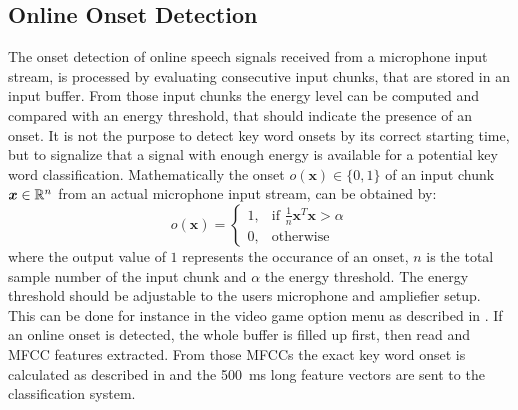 
\subsection{Online Onset Detection}\label{sec:signal_onset_online}
The onset detection of online speech signals received from a microphone input stream, is processed by evaluating consecutive input chunks, that are stored in an input buffer.
From those input chunks the energy level can be computed and compared with an energy threshold, that should indicate the presence of an onset.
It is not the purpose to detect key word onsets by its correct starting time, but to signalize that a signal with enough energy is available for a potential key word classification.
Mathematically the onset $o(\bm{x}) \in \{0, 1\}$ of an input chunk $\bm{x} \in \mathbb{R}^n$ from an actual microphone input stream, can be obtained by:
\begin{equation}
  o(\bm{x}) = 
  \begin{cases}
    1, & \text{if } \frac{1}{n} \bm{x}^T \bm{x} > \alpha\\
    0, & \text{otherwise} 
  \end{cases}
\end{equation}
where the output value of $1$ represents the occurance of an onset, $n$ is the total sample number of the input chunk and $\alpha$ the energy threshold.
The energy threshold should be adjustable to the users microphone and ampliefier setup. 
This can be done for instance in the video game option menu as described in .
If an online onset is detected, the whole buffer is filled up first, then read and MFCC features extracted.
From those MFCCs the exact key word onset is calculated as described in  and the \SI{500}{\milli\second} long feature vectors are sent to the classification system.
